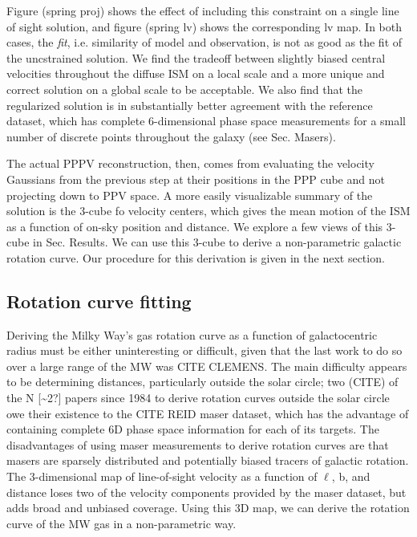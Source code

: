 Figure (spring proj) shows the effect of including this constraint on a single line of sight solution, and figure (spring lv) shows the corresponding lv map. In both cases, the \emph{fit}, i.e. similarity of model and observation, is not as good as the fit of the uncstrained solution. We find the tradeoff between slightly biased central velocities throughout the diffuse ISM on a local scale and a more unique and correct solution on a global scale to be acceptable. We also find that the regularized solution is in substantially better agreement with the reference dataset, which has complete 6-dimensional phase space measurements for a small number of discrete points throughout the galaxy (see Sec. Masers). 

The actual PPPV reconstruction, then, comes from evaluating the velocity Gaussians from the previous step at their positions in the PPP cube and not projecting down to PPV space. A more easily visualizable summary of the solution is the 3-cube fo velocity centers, which gives the mean motion of the ISM as a function of on-sky position and distance. We explore a few views of this 3-cube in Sec. Results. We can use this 3-cube to derive a non-parametric galactic rotation curve. Our procedure for this derivation is given in the next section. 

\subsection{Rotation curve fitting}

Deriving the Milky Way's gas rotation curve as a function of galactocentric radius must be either uninteresting or difficult, given that the last work to do so over a large range of the MW was CITE CLEMENS. The main difficulty appears to be determining distances, particularly outside the solar circle; two (CITE) of the N [\sim 2?] papers since 1984 to derive rotation curves outside the solar circle owe their existence to the CITE REID maser dataset, which has the advantage of containing complete 6D phase space information for each of its targets. The disadvantages of using maser measurements to derive rotation curves are that masers are sparsely distributed and potentially biased tracers of galactic rotation. The 3-dimensional map of line-of-sight velocity as a function of $\ell$, b, and distance loses two of the velocity components provided by the maser dataset, but adds broad and unbiased coverage. Using this 3D map, we can derive the rotation curve of the MW gas in a non-parametric way.

